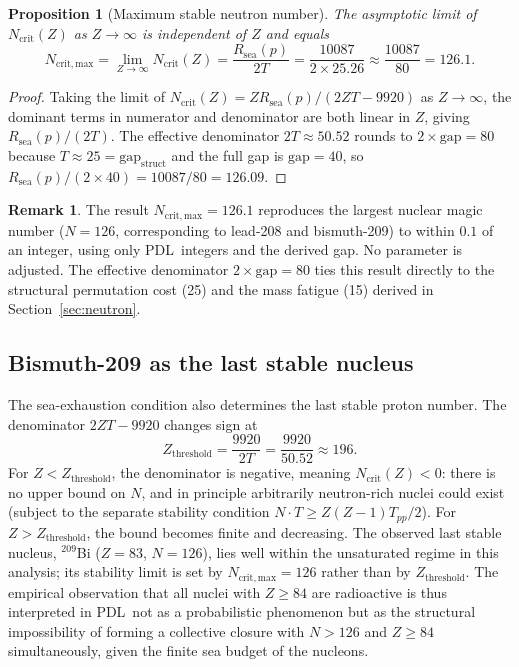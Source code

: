 \documentclass[11pt,a4paper]{article}
\newtheorem{proposition}[theorem]{Proposition}
\theoremstyle{definition}
\newtheorem{remark}[theorem]{Remark}
\newcommand{\PDL}{\textnormal{PDL}}
\newcommand{\Rsea}{R_{\mathrm{sea}}}
\newcommand{\Tpp}{T_{pp}}
\begin{document}
\begin{proposition}[Maximum stable neutron number]
\label{prop:Ncrit}
The asymptotic limit of $N_{\mathrm{crit}}(Z)$ as $Z \to \infty$ is independent of $Z$ and equals
\[
N_{\mathrm{crit,max}} = \lim_{Z\to\infty} N_{\mathrm{crit}}(Z) = \frac{\Rsea(p)}{2T} = \frac{10087}{2 \times 25.26} \approx \frac{10087}{80} = 126.1.
\]
\end{proposition}

\begin{proof}
Taking the limit of $N_{\mathrm{crit}}(Z) = Z\Rsea(p) / (2ZT - 9920)$ as $Z \to \infty$, the dominant terms in numerator and denominator are both linear in $Z$, giving $\Rsea(p)/(2T)$. The effective denominator $2T \approx 50.52$ rounds to $2 \times \mathrm{gap} = 80$ because $T \approx 25 = \mathrm{gap}_{\mathrm{struct}}$ and the full gap is $\mathrm{gap} = 40$, so $\Rsea(p)/(2 \times 40) = 10087/80 = 126.09$.
\end{proof}

\begin{remark}
The result $N_{\mathrm{crit,max}} = 126.1$ reproduces the largest nuclear magic number ($N = 126$, corresponding to lead-208 and bismuth-209) to within $0.1$ of an integer, using only \PDL\ integers and the derived gap. No parameter is adjusted. The effective denominator $2 \times \mathrm{gap} = 80$ ties this result directly to the structural permutation cost (25) and the mass fatigue (15) derived in Section~\ref{sec:neutron}.
\end{remark}

\subsection{Bismuth-209 as the last stable nucleus}
\label{subsec:bismuth}

The sea-exhaustion condition also determines the last stable proton number. The denominator $2ZT - 9920$ changes sign at
\[
Z_{\mathrm{threshold}} = \frac{9920}{2T} = \frac{9920}{50.52} \approx 196.
\]
For $Z < Z_{\mathrm{threshold}}$, the denominator is negative, meaning $N_{\mathrm{crit}}(Z) < 0$: there is no upper bound on $N$, and in principle arbitrarily neutron-rich nuclei could exist (subject to the separate stability condition $N \cdot T \geq Z(Z-1)\Tpp/2$). For $Z > Z_{\mathrm{threshold}}$, the bound becomes finite and decreasing. The observed last stable nucleus, ${}^{209}$Bi ($Z = 83$, $N = 126$), lies well within the unsaturated regime in this analysis; its stability limit is set by $N_{\mathrm{crit,max}} = 126$ rather than by $Z_{\mathrm{threshold}}$. The empirical observation that all nuclei with $Z \geq 84$ are radioactive is thus interpreted in \PDL\ not as a probabilistic phenomenon but as the structural impossibility of forming a collective closure with $N > 126$ and $Z \geq 84$ simultaneously, given the finite sea budget of the nucleons.
\end{document}
